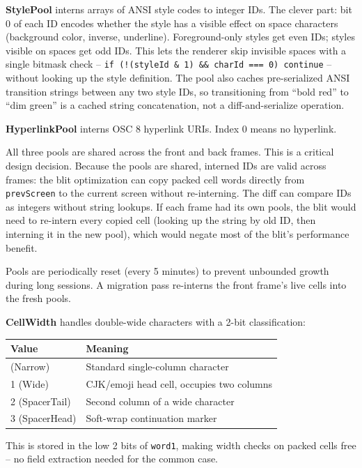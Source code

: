 \documentclass[
  english,
  11pt,
  letterpaper,
]{book}
\begin{document}
\textbf{StylePool} interns arrays of ANSI style codes to integer IDs.
The clever part: bit 0 of each ID encodes whether the style has a
visible effect on space characters (background color, inverse,
underline). Foreground-only styles get even IDs; styles visible on
spaces get odd IDs. This lets the renderer skip invisible spaces with a
single bitmask check --
\texttt{if\ (!(styleId\ \&\ 1)\ \&\&\ charId\ ===\ 0)\ continue} --
without looking up the style definition. The pool also caches
pre-serialized ANSI transition strings between any two style IDs, so
transitioning from ``bold red'' to ``dim green'' is a cached string
concatenation, not a diff-and-serialize operation.

\textbf{HyperlinkPool} interns OSC 8 hyperlink URIs. Index 0 means no
hyperlink.

All three pools are shared across the front and back frames. This is a
critical design decision. Because the pools are shared, interned IDs are
valid across frames: the blit optimization can copy packed cell words
directly from \texttt{prevScreen} to the current screen without
re-interning. The diff can compare IDs as integers without string
lookups. If each frame had its own pools, the blit would need to
re-intern every copied cell (looking up the string by old ID, then
interning it in the new pool), which would negate most of the blit's
performance benefit.

Pools are periodically reset (every 5 minutes) to prevent unbounded
growth during long sessions. A migration pass re-interns the front
frame's live cells into the fresh pools.

\textbf{CellWidth} handles double-wide characters with a 2-bit
classification:

\begin{longtable}[]{@{}ll@{}}
\toprule\noalign{}
Value & Meaning \\
\midrule\noalign{}
\endhead
\bottomrule\noalign{}
\endlastfoot
0 (Narrow) & Standard single-column character \\
1 (Wide) & CJK/emoji head cell, occupies two columns \\
2 (SpacerTail) & Second column of a wide character \\
3 (SpacerHead) & Soft-wrap continuation marker \\
\end{longtable}

This is stored in the low 2 bits of \texttt{word1}, making width checks
on packed cells free -- no field extraction needed for the common case.
\end{document}
